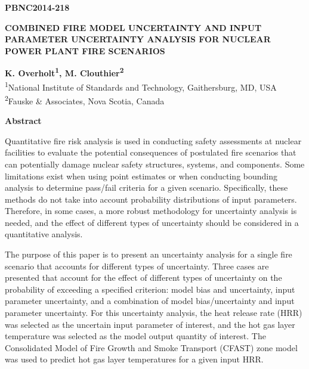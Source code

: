 \documentclass[12pt]{article}
\begin{document}
\begin{flushright}
\textbf{PBNC2014-218}
\end{flushright}

\begin{center}
\textbf{COMBINED FIRE MODEL UNCERTAINTY AND INPUT PARAMETER UNCERTAINTY ANALYSIS FOR NUCLEAR POWER PLANT FIRE SCENARIOS}
\end{center}

\begin{center}
\textbf{K. Overholt\textsuperscript{1}, M. Clouthier\textsuperscript{2}}\\
\textsuperscript{1}National Institute of Standards and Technology, Gaithersburg, MD, USA\\
\textsuperscript{2}Fauske \& Associates, Nova Scotia, Canada
\end{center}

\begin{center}
\textbf{Abstract}
\end{center}

\linenumbers 
 
Quantitative fire risk analysis is used in conducting safety assessments at nuclear facilities to evaluate the potential consequences of postulated fire scenarios that can potentially damage nuclear safety structures, systems, and components. Some limitations exist when using point estimates or when conducting bounding analysis to determine pass/fail criteria for a given scenario. Specifically, these methods do not take into account probability distributions of input parameters. Therefore, in some cases, a more robust methodology for uncertainty analysis is needed, and the effect of different types of uncertainty should be considered in a quantitative analysis.

The purpose of this paper is to present an uncertainty analysis for a single fire scenario that accounts for different types of uncertainty. Three cases are presented that account for the effect of different types of uncertainty on the probability of exceeding a specified criterion: model bias and uncertainty, input parameter uncertainty, and a combination of model bias/uncertainty and input parameter uncertainty. For this uncertainty analysis, the heat release rate (HRR) was selected as the uncertain input parameter of interest, and the hot gas layer temperature was selected as the model output quantity of interest. The Consolidated Model of Fire Growth and Smoke Transport (CFAST) zone model was used to predict hot gas layer temperatures for a given input HRR.
\end{document}
